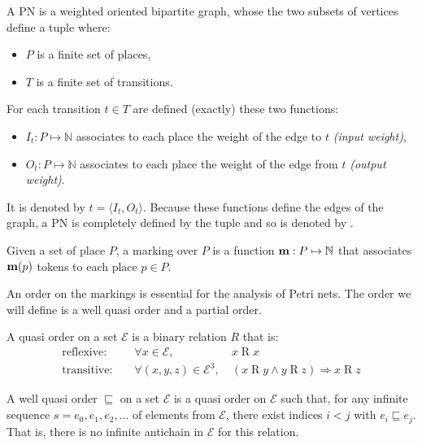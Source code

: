 \begin{defi}[\acl{PN}]
  A \acf{PN} \tupleN is a weighted oriented bipartite graph, whose the two subsets of vertices define a tuple \PT where:
  \begin{itemize}
    \item $P$ is a finite set of places,
    \item $T$ is a finite set of transitions.
  \end{itemize}
  For each transition $t \in T$ are defined (exactly) these two functions:
  \begin{itemize}
    \item $I_t : P \mapsto \mathbb{N}$ associates to each place the weight of the edge to $t$ \emph{(input weight)},
    \item $O_t : P \mapsto \mathbb{N}$ associates to each place the weight of the edge from $t$ \emph{(output weight)}.
  \end{itemize}
  It is denoted by $t = \langle I_t, O_t \rangle$.
  Because these functions define the edges of the graph, a \ac{PN} is completely defined by the tuple \PT and so is denoted by \NPT.
\end{defi}

\begin{defi}[marking]
  Given a set of place $P$, a marking over $P$ is a function $\mathbf{m} : P \mapsto \mathbb{N}$ that associates $\mathbf{m}(p)$ tokens to each place $p \in P$.
\end{defi}

An order on the markings is essential for the analysis of Petri nets. The order we will define is a well quasi order and a partial order.

\begin{defi}
  A quasi order on a set $\mathcal{E}$ is a binary relation $R$ that is:
  \begin{align*}
    \text{reflexive: } &&\forall x \in \mathcal{E},\ & x \mathrel{R} x \\
    \text{transitive: } &&\forall (x, y, z) \in \mathcal{E}^3,\ & (x \mathrel{R} y\land y \mathrel{R} z)\Rightarrow x \mathrel{R} z
  \end{align*}
\end{defi}

\begin{defi}
  A well quasi order $\sqsubseteq$ on a set $\mathcal{E}$ is a quasi order on $\mathcal{E}$ such that, for any infinite sequence $s = e_0, e_1, e_2, \dots$ of elements from $\mathcal{E}$, there exist indices $i < j$ with $e_i \sqsubseteq e_j$. That is, there is no infinite antichain in $\mathcal{E}$ for this relation.
\end{defi}

